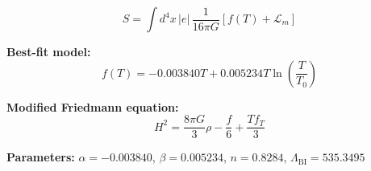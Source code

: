 
\begin{equation}
  S = \int d^4x \, |e| \, \frac{1}{16\pi G} \left[ f(T) + \mathcal{L}_m \right]
\end{equation}

\textbf{Best-fit model:}
\begin{equation}
  f(T) = -0.003840 T + 0.005234 T \ln\!\left(\frac{T}{T_0}\right)
\end{equation}

\textbf{Modified Friedmann equation:}
\begin{equation}
  H^2 = \frac{8\pi G}{3} \rho - \frac{f}{6} + \frac{T f_T}{3}
\end{equation}

\textbf{Parameters:}
$\alpha = -0.003840$, \quad
$\beta = 0.005234$, \quad
$n = 0.8284$, \quad
$\Lambda_{\text{BI}} = 535.3495$